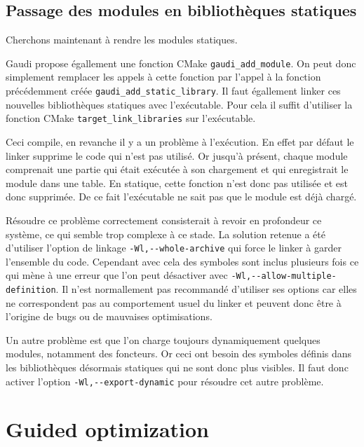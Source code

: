 \documentclass[a4paper]{report}
\begin{document}
        \subsection{Passage des modules en bibliothèques statiques}
            Cherchons maintenant à rendre les modules statiques.

            Gaudi propose égallement une fonction CMake \verb'gaudi_add_module'.
            On peut donc simplement remplacer les appels à cette fonction par l'appel à la fonction précédemment créée \verb'gaudi_add_static_library'.
            Il faut égallement linker ces nouvelles bibliothèques statiques avec l'exécutable.
            Pour cela il suffit d'utiliser la fonction CMake \verb'target_link_libraries' sur l'exécutable.

            Ceci compile, en revanche il y a un problème à l'exécution.
            En effet par défaut le linker supprime le code qui n'est pas utilisé.
            Or jusqu'à présent, chaque module comprenait une partie qui était exécutée à son chargement et qui enregistrait le module dans une table.
            En statique, cette fonction n'est donc pas utilisée et est donc supprimée.
            De ce fait l'exécutable ne sait pas que le module est déjà chargé.

            Résoudre ce problème correctement consisterait à revoir en profondeur ce système, ce qui semble trop complexe à ce stade.
            La solution retenue a été d'utiliser l'option de linkage \verb'-Wl,--whole-archive' qui force le linker à garder l'ensemble du code.
            Cependant avec cela des symboles sont inclus plusieurs fois ce qui mène à une erreur que l'on peut désactiver avec \verb'-Wl,--allow-multiple-definition'.
            Il n'est normallement pas recommandé d'utiliser ses options car elles ne correspondent pas au comportement usuel du linker et peuvent donc être à l'origine de bugs ou de mauvaises optimisations.

            Un autre problème est que l'on charge toujours dynamiquement quelques modules, notamment des foncteurs.
            Or ceci ont besoin des symboles définis dans les bibliothèques désormais statiques qui ne sont donc plus visibles.
            Il faut donc activer l'option \verb'-Wl,--export-dynamic' pour résoudre cet autre problème.


    \section{Guided optimization}
\end{document}

